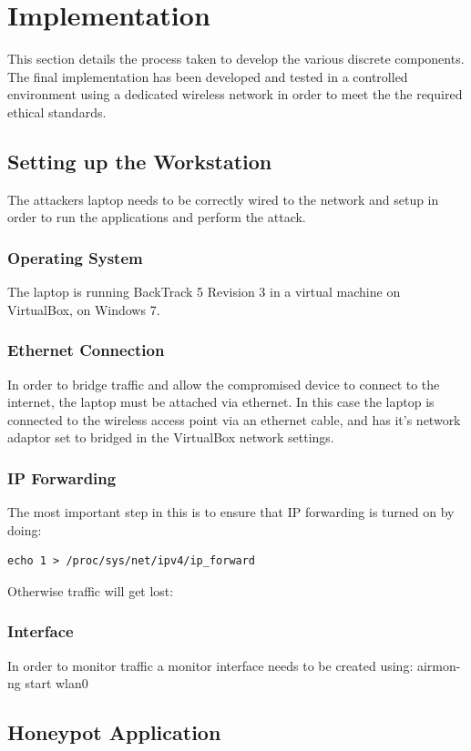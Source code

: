 \section{Implementation}
This section details the process taken to develop the various discrete components. The final implementation has been developed and tested in a controlled environment using a dedicated wireless network in order to meet the the required ethical standards.
\subsection{Setting up the Workstation}
The attackers laptop needs to be correctly wired to the network and setup in order to run the applications and perform the attack. 

\subsubsection{Operating System}
The laptop is running BackTrack 5 Revision 3 in a virtual machine on VirtualBox, on Windows 7.

\subsubsection{Ethernet Connection}
In order to bridge traffic and allow the compromised device to connect to the internet, the laptop must be attached via ethernet. In this case the laptop is connected to the wireless access point via an ethernet cable, and has it’s network adaptor set to bridged in the VirtualBox network settings.

\subsubsection{IP Forwarding}
The most important step in this is to ensure that IP forwarding is turned on by doing:
\begin{verbatim}
echo 1 > /proc/sys/net/ipv4/ip_forward
\end{verbatim}
Otherwise traffic will get lost:

\subsubsection{Interface}
In order to monitor traffic a monitor interface needs to be created using:
airmon-ng start wlan0

\subsection{Honeypot Application}
